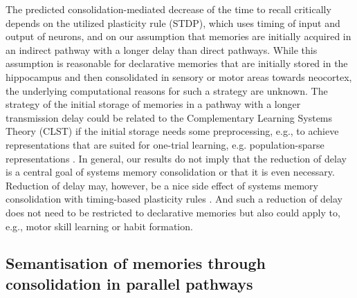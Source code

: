 The predicted consolidation-mediated decrease of the time to recall critically depends on the utilized plasticity rule (STDP), which uses timing of input and output of neurons, and on our assumption that memories are initially acquired in an indirect pathway with a longer delay than direct pathways. While this assumption is reasonable for declarative memories that are initially stored in the hippocampus and then consolidated in sensory or motor areas towards neocortex, the underlying computational reasons for such a strategy are unknown. The strategy of the initial storage of memories in a pathway with a longer transmission delay could be related to the Complementary Learning Systems Theory (CLST) \cite{McClelland1995, McClelland2013} if the initial storage needs some preprocessing, e.g., to achieve representations that are suited for one-trial learning, e.g. population-sparse representations \cite{Leibold2008}. In general, our results do not imply that the reduction of delay is a central goal of systems memory consolidation or that it is even necessary. Reduction of delay may, however, be a nice side effect of systems memory consolidation with timing-based plasticity rules \cite{Song2000}. And such a reduction of delay does not need to be restricted to declarative memories but also could apply to, e.g., motor skill learning or habit formation.

\subsection{Semantisation of memories through consolidation in parallel pathways}
\label{sec:ppt-results-semantization}

